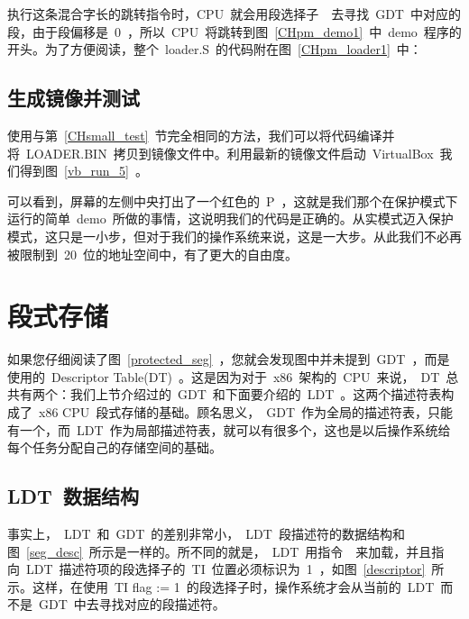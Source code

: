 执行这条混合字长的跳转指令时，CPU~就会用段选择子~~去寻找~GDT~中对应的段，由于段偏移是~0~，所以~CPU~将跳转到图~\ref{CHpm_demo1}~中~demo~程序的开头。为了方便阅读，整个~loader.S~的代码附在图~\ref{CHpm_loader1}~中：

\label{CHpm_loader1}

\subsection{生成镜像并测试}

使用与第~\ref{CHsmall_test}~节完全相同的方法，我们可以将代码编译并将~LOADER.BIN~拷贝到镜像文件中。利用最新的镜像文件启动~VirtualBox~我们得到图~\ref{vb_run_5}~。

可以看到，屏幕的左侧中央打出了一个红色的~P~，这就是我们那个在保护模式下运行的简单~demo~所做的事情，这说明我们的代码是正确的。从实模式迈入保护模式，这只是一小步，但对于我们的操作系统来说，这是一大步。从此我们不必再被限制到~20~位的地址空间中，有了更大的自由度。


\section{段式存储}

如果您仔细阅读了图~\ref{protected_seg}~，您就会发现图中并未提到~GDT~，而是使用的~Descriptor Table(DT)~。这是因为对于~x86~架构的~CPU~来说，~DT~总共有两个：我们上节介绍过的~GDT~和下面要介绍的~LDT~。这两个描述符表构成了~x86 CPU~段式存储的基础。顾名思义，~GDT~作为全局的描述符表，只能有一个，而~LDT~作为局部描述符表，就可以有很多个，这也是以后操作系统给每个任务分配自己的存储空间的基础。

\subsection{LDT~数据结构} \label{CHpm_ldt}


事实上，~LDT~和~GDT~的差别非常小，~LDT~段描述符的数据结构和图~\ref{seg_desc}~所示是一样的。所不同的就是，~LDT~用指令~~来加载，并且指向~LDT~描述符项的段选择子的~TI~位置必须标识为~1~，如图~\ref{descriptor}~所示。这样，在使用~TI flag := 1~的段选择子时，操作系统才会从当前的~LDT~而不是~GDT~中去寻找对应的段描述符。

